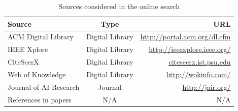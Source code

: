 \documentclass[a4paper]{book}
\begin{document}
\begin{appendices}
\begin{table}[htdp]
\begin{center}
\begin{tabular}{|l|c|r|}\hline
Source                  &   Type                        & URL \\ \hline \hline
ACM Digital Library     &   Digital Library             & \url{http://portal.acm.org/dl.cfm} \\  \hline %
IEEE Xplore             &   Digital Library             & \url{http://ieeexplore.ieee.org/} \\ \hline   %
CiteSeerX               &   Digital Library             & \url{citeseerx.ist.psu.edu} \\ \hline         %
Web of Knowledge        &   Digital Library             & \url{http://wokinfo.com/} \\ \hline           %
Journal of AI Research   &   Journal                     & \url{http://jair.org/} \\  \hline      %
References in papers    &   N/A                         & N/A \\\hline\hline
\end{tabular}
\end{center}
\label{table:sources}
\caption{Sources considered in the online search}
\end{table}

\end{appendices}
\end{document}
